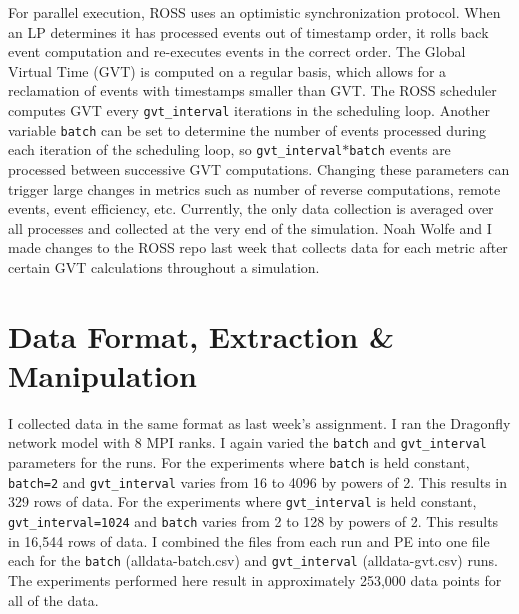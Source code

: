 \documentclass[12pt]{article}
\begin{document}
For parallel execution, ROSS uses an optimistic synchronization protocol.  When an LP determines it has processed events out of timestamp order, it rolls back event computation and re-executes events in the correct order.  The Global Virtual Time (GVT) is computed on a regular basis, which allows for a reclamation of events with timestamps smaller than GVT.  The ROSS scheduler computes GVT every \texttt{gvt\_interval} iterations in the scheduling loop.  Another variable \texttt{batch} can be set to determine the number of events processed during each iteration of the scheduling loop, so \texttt{gvt\_interval$*$batch} events are processed between successive GVT computations.  Changing these parameters can trigger large changes in metrics such as number of reverse computations, remote events, event efficiency, etc. Currently, the only data collection is averaged over all processes and collected at the very end of the simulation. Noah Wolfe and I made changes to the ROSS repo last week that collects data for each metric after certain GVT calculations throughout a simulation. 


\section{Data Format, Extraction \& Manipulation} 
I collected data in the same format as last week's assignment.  I ran the Dragonfly network model with 8 MPI ranks.  I again varied the \texttt{batch} and \texttt{gvt\_interval} parameters for the runs.  For the experiments where \texttt{batch} is held constant, \texttt{batch=2} and \texttt{gvt\_interval} varies from 16 to 4096 by powers of 2.  This results in 329 rows of data.  For the experiments where \texttt{gvt\_interval} is held constant, \texttt{gvt\_interval=1024} and \texttt{batch} varies from 2 to 128 by powers of 2.  This results in 16,544 rows of data.  I combined the files from each run and PE into one file each for the \texttt{batch} (alldata-batch.csv) and \texttt{gvt\_interval} (alldata-gvt.csv) runs.  The experiments performed here result in approximately 253,000 data points for all of the data.
\end{document}

